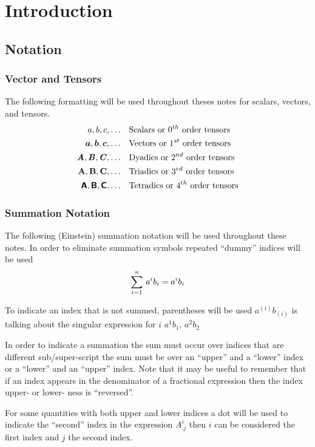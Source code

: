 \chapter{Introduction}
\label{cha:Introduction}

\section{Notation}
\label{sec:Notation}

 
\subsection{Vector and Tensors}
\label{subsec:VectorTensorNotation}

The following formatting will be used throughout theses notes for scalars, vectors, and tensors.
\begin{equation}
  \begin{split}
    a, b, c, \ldots & \quad\text{Scalars or $0^{th}$ order tensors} \\
     \boldsymbol{a} , \boldsymbol{b} , \boldsymbol{c} , \ldots & \quad\text{Vectors or $1^{st}$ order
      tensors} \\
    \boldsymbol{\mathit{A}},\boldsymbol{\mathit{B}},\boldsymbol{\mathit{C}}, \ldots & \quad\text{Dyadics or $2^{nd}$ order
      tensors} \\
    \boldsymbol{\mathrm{A}},\boldsymbol{\mathrm{B}},\boldsymbol{\mathrm{C}}, \ldots & \quad\text{Triadics or $3^{rd}$
      order tensors} \\
    \boldsymbol{\mathsf{A}},\boldsymbol{\mathsf{B}},\boldsymbol{\mathsf{C}}, \ldots & \quad\text{Tetradics or $4^{th}$
      order tensors}
  \end{split}
\end{equation}

\subsection{Summation Notation}
\label{subsec:SummationNotation}

The following (Einstein) summation notation will be
used throughout these notes. In order to eliminate summation symbols repeated
``dummy'' indices will be used \ie
\begin{equation}
    \displaystyle\sum_{i=1}^{n} \,a^{i}b_{i} =a^{i}b_{i}
\end{equation}

To indicate an index that is not summed, parentheses will be used
\ie $a^{(i)}b_{(i)}$ is talking about the singular expression for $i$ \eg
$a^{1}b_{1}$, $a^{2}b_{2}$ \etc

In order to indicate a summation the sum must occur over indices that are
different sub/super-script \ie the sum must be over an ``upper'' and a
``lower'' index or a ``lower'' and an ``upper'' index. Note that it may be
useful to remember that if an index appears in the denominator of a fractional
expression then the index upper- or lower- ness is ``reversed''. 

For some quantities with both upper and lower indices a dot will be used to
indicate the ``second'' index \eg in the expression $A^{i}_{.j}$ then $i$ can
be considered the first index and $j$ the second index.
